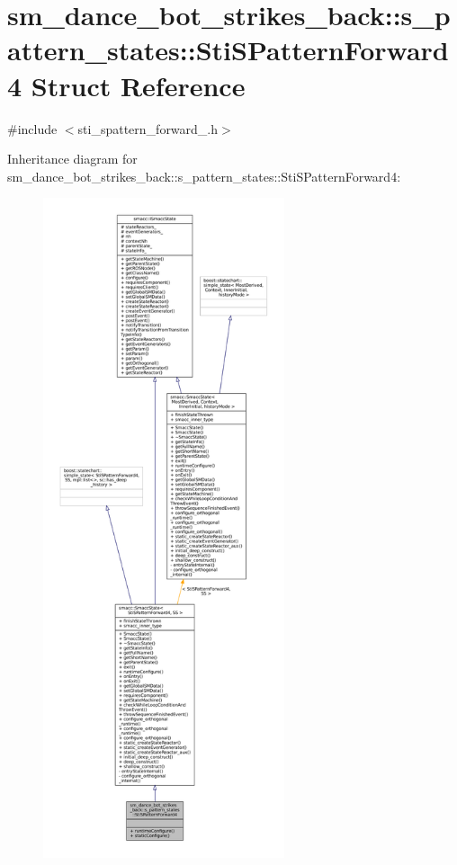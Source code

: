 \hypertarget{structsm__dance__bot__strikes__back_1_1s__pattern__states_1_1StiSPatternForward4}{}\section{sm\+\_\+dance\+\_\+bot\+\_\+strikes\+\_\+back\+:\+:s\+\_\+pattern\+\_\+states\+:\+:Sti\+S\+Pattern\+Forward4 Struct Reference}
\label{structsm__dance__bot__strikes__back_1_1s__pattern__states_1_1StiSPatternForward4}


{\ttfamily \#include $<$sti\+\_\+spattern\+\_\+forward\+\_.\+h$>$}



Inheritance diagram for sm\+\_\+dance\+\_\+bot\+\_\+strikes\+\_\+back\+:\+:s\+\_\+pattern\+\_\+states\+:\+:Sti\+S\+Pattern\+Forward4\+:
\nopagebreak
\begin{figure}[H]
\begin{center}
\leavevmode
\includegraphics[height=550pt]{structsm__dance__bot__strikes__back_1_1s__pattern__states_1_1StiSPatternForward4__inherit__graph}
\end{center}
\end{figure}


